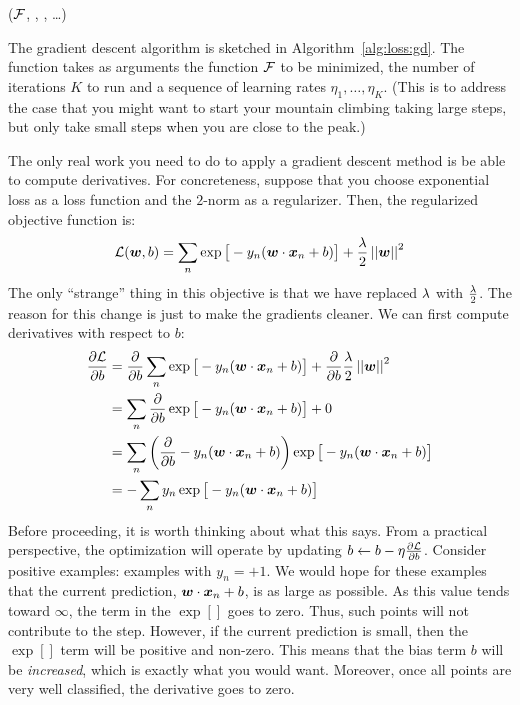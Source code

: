 %
  {($\mathcal{F}$, , , \dots)}
  {
\SETST{$\vz\kth$}{$\VARm{\vz\kpth} - \VARm{\eta}\VARm{\kth} \VARm{\vg\kth}$}
\ENDFOR
\RETURN \VARm{$\vz\Kth$}
}


The gradient descent algorithm is sketched in
Algorithm~\ref{alg:loss:gd}.  The function takes as arguments the
function $\mathcal{F}$ to be minimized, the number of iterations $K$ to run
and a sequence of learning rates $\eta_1, \dots, \eta_K$.  (This is to
address the case that you might want to start your mountain climbing
taking large steps, but only take small steps when you are close to
the peak.)

The only real work you need to do to apply a gradient descent method
is be able to compute derivatives.  For concreteness, suppose that you
choose exponential loss as a loss function and the $2$-norm as a
regularizer.  Then, the regularized objective function is:
%
\begin{equation}
\mathcal{L}({\boldsymbol{w}},b) =
\sum_n 
  \exp\big[-y_n (\boldsymbol{w} \cdot {\boldsymbol{x}}_n+b)\big] +
 \frac {\lambda} 2 \left\vert\left\vert {\boldsymbol{w}} \right\vert\right\vert^2
\end{equation}
%
The only ``strange'' thing in this objective is that we have replaced
$\lambda$ with $\frac {\lambda} 2$.  The reason for this change is just to make
the gradients cleaner.  We can first compute derivatives with respect
to $b$:
%
\begin{align}
\frac {\partial\mathcal{L}} {\partial b}
&= \frac \partial {\partial b}\sum_n \exp\big[-y_n (\boldsymbol{w} \cdot {\boldsymbol{x}}_n+b)\big] + \frac \partial {\partial b}\frac {\lambda} 2 \left\vert\left\vert {\boldsymbol{w}} \right\vert\right\vert^2\\
&= \sum_n \frac \partial {\partial b} \exp\big[ -y_n (\boldsymbol{w} \cdot {\boldsymbol{x}}_n+b)\big] + 0\\
&= \sum_n \left( \frac \partial {\partial b} -y_n (\boldsymbol{w} \cdot {\boldsymbol{x}}_n+b) \right) \exp\big[ -y_n (\boldsymbol{w} \cdot {\boldsymbol{x}}_n+b)\big]\\
&= - \sum_n y_n \exp\big[ -y_n (\boldsymbol{w} \cdot {\boldsymbol{x}}_n+b)\big]
\end{align}
%
Before proceeding, it is worth thinking about what this says.  From a
practical perspective, the optimization will operate by updating $b
\leftarrow b - \eta \frac {\partial \mathcal{L}} {\partial b}$.  Consider positive examples:
examples with $y_n=+1$.  We would hope for these examples that the
current prediction, ${\boldsymbol{w}} \cdot {\boldsymbol{x}}_n+b$, is as large as possible.
As this value tends toward $\infty$, the term in the $\exp[]$ goes to
zero.  Thus, such points will not contribute to the step.  However, if
the current prediction is small, then the $\exp[]$ term will be
positive and non-zero.  This means that the bias term $b$ will be
\emph{increased}, which is exactly what you would want.  Moreover,
once all points are very well classified, the derivative goes to zero.

